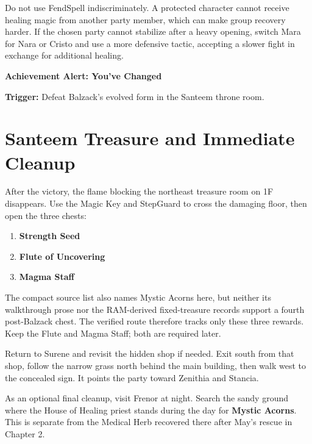 \documentclass[
  american,
  10pt,
  letterpaper,
  oneside,
  open=any]{scrreprt}
\providecommand{\tightlist}{%
  \setlength{\itemsep}{0pt}\setlength{\parskip}{0pt}}
\begin{document}
Do not use FendSpell indiscriminately. A protected character cannot
receive healing magic from another party member, which can make group
recovery harder. If the chosen party cannot stabilize after a heavy
opening, switch Mara for Nara or Cristo and use a more defensive tactic,
accepting a slower fight in exchange for additional healing.

\begin{achievementalert}

\textbf{Achievement Alert: You've Changed}

\textbf{Trigger:} Defeat Balzack's evolved form in the Santeem throne
room.

\end{achievementalert}

\section{Santeem Treasure and Immediate
Cleanup}\label{santeem-treasure-and-immediate-cleanup}

After the victory, the flame blocking the northeast treasure room on 1F
disappears. Use the Magic Key and StepGuard to cross the damaging floor,
then open the three chests:

\begin{enumerate}
\def\labelenumi{\arabic{enumi}.}
\tightlist
\item
  \textbf{Strength Seed}
\item
  \textbf{Flute of Uncovering}
\item
  \textbf{Magma Staff}
\end{enumerate}

The compact source list also names Mystic Acorns here, but neither its
walkthrough prose nor the RAM-derived fixed-treasure records support a
fourth post-Balzack chest. The verified route therefore tracks only
these three rewards. Keep the Flute and Magma Staff; both are required
later.

Return to Surene and revisit the hidden shop if needed. Exit south from
that shop, follow the narrow grass north behind the main building, then
walk west to the concealed sign. It points the party toward Zenithia and
Stancia.

As an optional final cleanup, visit Frenor at night. Search the sandy
ground where the House of Healing priest stands during the day for
\textbf{Mystic Acorns}. This is separate from the Medical Herb recovered
there after May's rescue in Chapter 2.
\end{document}
